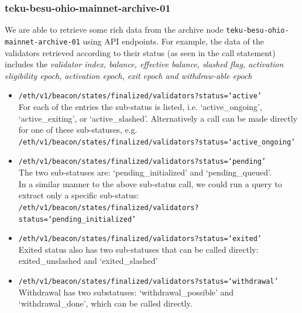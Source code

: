 \documentclass[UTF8]{article}
\begin{document}
{\clearpage
\subsubsection*{teku-besu-ohio-mainnet-archive-01}

We are able to retrieve some rich data from the archive node \texttt{teku-besu-ohio-mainnet-archive-01} using API endpoints. For example, the data of the validators retrieved according to their status (as seen in the call statement)  includes the \textit{validator index, balance, effective balance, slashed flag, activation eligibility epoch, activation epoch, exit epoch and withdraw-able epoch}
\begin{itemize}
\item \texttt{/eth/v1/beacon/states/finalized/validators?status=`active'} \\
For each of the entries the sub-status is listed, i.e. `active\_ongoing', `active\_exiting', or `active\_slashed'. Alternatively a call can be made directly for one of these sub-statuses, e.g. \\
 \texttt{/eth/v1/beacon/states/finalized/validators?status=`active\_ongoing'}
\item \texttt{/eth/v1/beacon/states/finalized/validators?status=`pending'}\\
The two sub-statuses are: `pending\_initialized' and `pending\_queued'. \\
In a similar manner to the above sub-status call, we could run a query to extract only a specific sub-status:\\
\texttt{/eth/v1/beacon/states/finalized/validators?status=`pending\_initialized'}
\item \texttt{/eth/v1/beacon/states/finalized/validators?status=`exited'} \\
Exited status also has two sub-statuses that can be called directly: exited\_unslashed and `exited\_slashed'
\item \texttt{/eth/v1/beacon/states/finalized/validators?status=`withdrawal'} \\
Withdrawal has two substatuses: `withdrawal\_possible' and `withdrawal\_done', which can be called directly.
\end{itemize}
\clearpage

}
\end{document}
